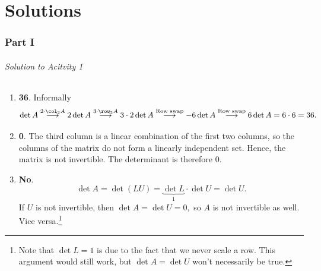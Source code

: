 \part{Solutions}

\section{Part I}
\paragraph{Solution to Acitvity 1}

\begin{enumerate}
	\item \textbf{36}. Informally 
		\[\det A \overset{2 \cdot \col_2 A}{\longrightarrow} 2\det A \overset{3 \cdot \row_2 A}{\longrightarrow} 3 \cdot 2 \det A 
		   \overset{\text{Row swap}}{\longrightarrow} -6\det A \overset{\text{Row swap}}{\longrightarrow}6 \det A = 6 \cdot 6 = 36.\]

	\item \textbf{0}. The third column is a linear combination of the first two columns, so the columns of the matrix do not form a linearly independent set. Hence,
		the matrix is not invertible. The determinant is therefore 0.
	
	\item \textbf{No}. \[\det A = \det(LU) = \underbrace{\det L}_{1} \cdot \det U = \det U.\] If \(U\) is not invertible, then \(\det A = \det U = 0,\) so \(A\) is not
		invertible as well. Vice versa.\footnote{Note that \(\det L = 1\) is due to the fact that we never scale a row. This argument would still work, but 
		\(\det A = \det U\) won't necessarily be true.}


\end{enumerate}
